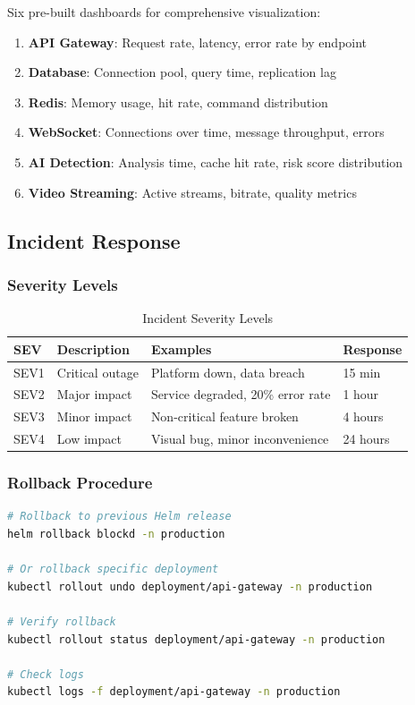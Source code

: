 \documentclass[11pt,letterpaper]{article}
\begin{document}
Six pre-built dashboards for comprehensive visualization:

\begin{enumerate}
    \item \textbf{API Gateway}: Request rate, latency, error rate by endpoint
    \item \textbf{Database}: Connection pool, query time, replication lag
    \item \textbf{Redis}: Memory usage, hit rate, command distribution
    \item \textbf{WebSocket}: Connections over time, message throughput, errors
    \item \textbf{AI Detection}: Analysis time, cache hit rate, risk score distribution
    \item \textbf{Video Streaming}: Active streams, bitrate, quality metrics
\end{enumerate}

\subsection{Incident Response}

\subsubsection{Severity Levels}

\begin{table}[H]
\centering
\begin{tabularx}{\textwidth}{llXl}
\toprule
\textbf{SEV} & \textbf{Description} & \textbf{Examples} & \textbf{Response} \\
\midrule
SEV1 & Critical outage & Platform down, data breach & 15 min \\
SEV2 & Major impact & Service degraded, 20\% error rate & 1 hour \\
SEV3 & Minor impact & Non-critical feature broken & 4 hours \\
SEV4 & Low impact & Visual bug, minor inconvenience & 24 hours \\
\bottomrule
\end{tabularx}
\caption{Incident Severity Levels}
\end{table}

\subsubsection{Rollback Procedure}

\begin{lstlisting}[language=bash, caption=Emergency Rollback]
# Rollback to previous Helm release
helm rollback blockd -n production

# Or rollback specific deployment
kubectl rollout undo deployment/api-gateway -n production

# Verify rollback
kubectl rollout status deployment/api-gateway -n production

# Check logs
kubectl logs -f deployment/api-gateway -n production
\end{lstlisting}
\end{document}
